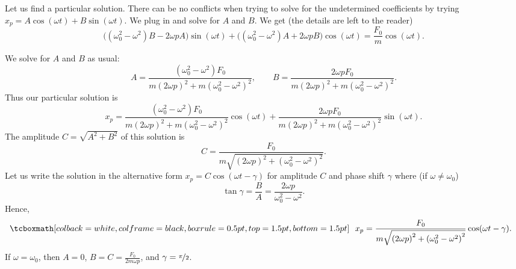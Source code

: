 \pagebreak[2]
Let us find a particular solution.
There can be no conflicts when trying to solve for the
undetermined coefficients by trying $x_p = A \cos (\omega t)
+ B \sin (\omega t)$.
We plug in and solve for $A$ and $B$.
We get (the  %
details are left to the reader)
\begin{equation*}
\bigl((\omega_0^2  - \omega^2)B - 2\omega p A\bigr) \sin (\omega t)
+
\bigl((\omega_0^2  - \omega^2)A + 2\omega p B\bigr) \cos (\omega t)
=
\frac{F_0}{m} \cos (\omega t) .
\end{equation*}

We solve for $A$ and $B$ as usual:
\begin{equation*}
A=\frac{(\omega_0^2-\omega^2) F_0}
{m{(2\omega p)}^2+m{(\omega_0^2-\omega^2)}^2} ,
\qquad B=\frac{2 \omega p F_0}
{m{(2\omega p)}^2+m{(\omega_0^2-\omega^2)}^2} .
\end{equation*}
Thus our particular solution is
\begin{equation*}
x_p = 
\frac{(\omega_0^2-\omega^2) F_0}
{m{(2\omega p)}^2+m{(\omega_0^2-\omega^2)}^2} \cos (\omega t) +
\frac{2 \omega p F_0}
{m{(2\omega p)}^2+m{(\omega_0^2-\omega^2)}^2} \sin (\omega t) .
\end{equation*}
The amplitude $C = \sqrt{A^2+B^2}$ of this solution is
\begin{equation*}
C = \frac{F_0}{m \sqrt{{(2\omega p)}^2+{(\omega_0^2-\omega^2)}^2}} .
\end{equation*}
Let us write the solution
in the alternative form $x_p = C \cos(\omega t - \gamma)$
for amplitude $C$ and phase shift $\gamma$ where (if $\omega \neq \omega_0$)
\begin{equation*}
\tan \gamma = \frac{B}{A} = \frac{2\omega p}{\omega_0^2-\omega^2} .
\end{equation*}
Hence,
\begin{equation*}
\mybxbg{~~
x_p = 
\frac{F_0}{m \sqrt{{(2\omega p)}^2+{(\omega_0^2-\omega^2)}^2}} 
\cos ( \omega t - \gamma ) .
~~}
\end{equation*}
If $\omega = \omega_0$, then $A=0$, $B = C = \frac{F_0}{2m\omega p}$,
and $\gamma = \nicefrac{\pi}{2}$.



